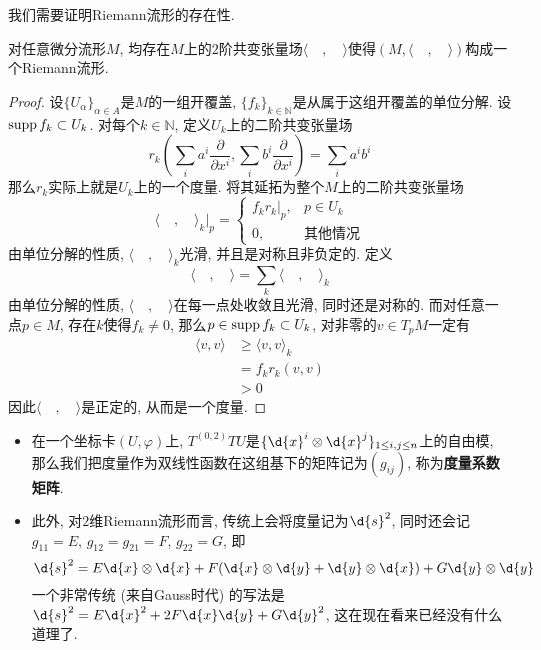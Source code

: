 我们需要证明Riemann流形的存在性.
\begin{thm}[Riemann度量的存在性]
    对任意微分流形$M$, 均存在$M$上的$2$阶共变张量场$\langle\quad,\quad\rangle$使得$(M,\langle\quad,\quad\rangle)$构成一个Riemann流形.
\end{thm}
\begin{proof}
    设$\{U_\alpha\}_{\alpha\in A}$是$M$的一组开覆盖, $\{f_k\}_{k\in\mathbb{N}}$是从属于这组开覆盖的单位分解.
    设$\operatorname{supp}{f_k}\subset U_k$.
    对每个$k\in\mathbb{N}$, 定义$U_k$上的二阶共变张量场
    \[r_k\left(\sum_{i}a^i\frac{\partial}{\partial x^i},\sum_{i}b^i\frac{\partial}{\partial x^i}\right)=\sum_ia^ib^i\]
    那么$r_k$实际上就是$U_k$上的一个度量.
    将其延拓为整个$M$上的二阶共变张量场
    \[\langle\quad,\quad\rangle_k|_p=\begin{cases}
        f_kr_k|_p, & p\in U_k\\
        0, & \text{其他情况}
    \end{cases}\]
    由单位分解的性质, $\langle\quad,\quad\rangle_k$光滑, 并且是对称且非负定的.
    定义
    \[\langle\quad,\quad\rangle=\sum_k\langle\quad,\quad\rangle_k\]
    由单位分解的性质, $\langle\quad,\quad\rangle$在每一点处收敛且光滑, 同时还是对称的.
    而对任意一点$p\in M$, 存在$k$使得$f_k\neq 0$, 那么$p\in\operatorname{supp}{f_k}\subset U_k$, 对非零的$v\in T_pM$一定有
    \begin{align*}
        \langle v,v\rangle&\geq\langle v,v\rangle_k\\
        &=f_kr_k(v,v)\\
        &>0
    \end{align*}
    因此$\langle\quad,\quad\rangle$是正定的, 从而是一个度量.
\end{proof}

\begin{sym}
    \begin{itemize}
        \item 在一个坐标卡$(U,\varphi)$上, $T^{(0,2)}TU$是$\{\d{x}^i\otimes\d{x}^j\}_{1\leq i,j\leq n}$上的自由模, 那么我们把度量作为双线性函数在这组基下的矩阵记为$(g_{ij})$, 称为\textbf{度量系数矩阵}.
        \item 此外, 对$2$维Riemann流形而言, 传统上会将度量记为$\d{s}^2$, 同时还会记$g_{11}=E$, $g_{12}=g_{21}=F$, $g_{22}=G$, 即
        \[\d{s}^2=E\d{x}\otimes\d{x}+F(\d{x}\otimes\d{y}+\d{y}\otimes\d{x})+G\d{y}\otimes\d{y}\]
        一个非常传统 (来自Gauss时代) 的写法是$\d{s}^2=E\d{x}^2+2F\d{x}\d{y}+G\d{y}^2$, 这在现在看来已经没有什么道理了.
    \end{itemize}
\end{sym}

